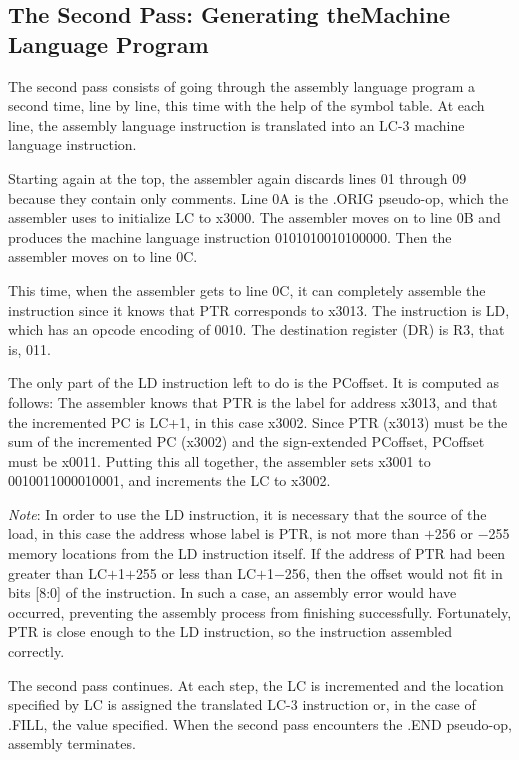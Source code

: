 \documentclass{patt}
\begin{document}
\subsection{The Second Pass: Generating the\break Machine
Language Program}

The second pass consists of going through the assembly language
program a second time, line by line, this time with the help of the
symbol table. At each line, the assembly language instruction is
translated into an LC-3 machine language instruction.

Starting again at the top, the assembler again discards lines 01
through 09 because they contain only comments.  Line 0A is the .ORIG
pseudo-op, which the assembler uses to initialize LC to x3000.  The
assembler moves on to line 0B and produces the machine language
instruction 0101010010100000.  Then the assembler moves on to line 0C.

This time, when the assembler gets to line 0C, it can completely
assemble the instruction since it knows that PTR corresponds to x3013.
The instruction is LD, which has an opcode encoding of 0010.  The
destination register (DR) is R3, that is, 011.

The only part of the LD instruction left to do is the PCoffset.
It is computed as follows: The assembler knows that PTR is the label for
address x3013, and that the incremented PC is LC+1, in this case
x3002.  Since PTR (x3013) must be the sum of the incremented PC
(x3002) and the sign-extended PCoffset, PCoffset must be x0011.
Putting this all together, the assembler sets x3001 to 0010011000010001, 
and increments the LC to x3002.

{\em Note}: In order to use the LD instruction, it is necessary that
the source of the load, in this case the address whose label is PTR,
is not more than $+$256 or $-$255 memory locations from the LD instruction
itself.  If the address of PTR had been greater than LC$+$1$+$255 or less
than LC$+$1$-$256, then the offset would not fit in bits [8:0] of the
instruction.  In such a case, an assembly error would have occurred,
preventing the assembly process from finishing successfully.
Fortunately, PTR is close enough to the LD instruction, so the
instruction assembled correctly.

The second pass continues.  At each step, the LC is incremented and
the location specified by LC is assigned the translated LC-3
instruction or, in the case of .FILL, the value specified. When the
second pass encounters the .END pseudo-op, assembly terminates.
\end{document}
